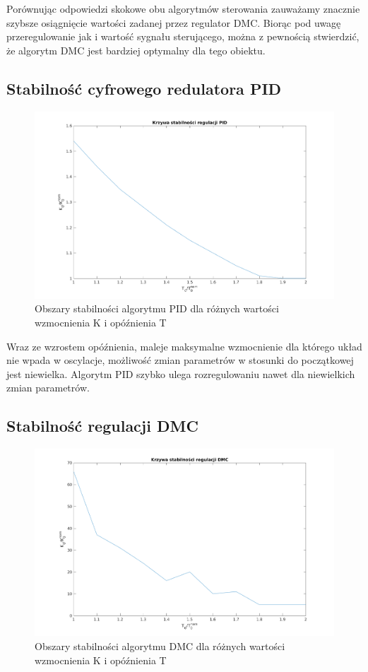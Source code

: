 \documentclass[a4paper, 11pt]{article}
\begin{document}
Porównując odpowiedzi skokowe obu algorytmów sterowania zauważamy znacznie szybsze osiągnięcie wartości zadanej przez regulator DMC. Biorąc pod uwagę przeregulowanie jak i wartość sygnału sterującego, można z pewnością stwierdzić, że algorytm DMC jest bardziej optymalny dla tego obiektu. 

 
\subsection{Stabilność cyfrowego redulatora PID}
\begin{figure}[H]
\centering
\includegraphics[scale=0.60]{pid_stability.png}
\caption{Obszary stabilności algorytmu PID dla różnych wartości wzmocnienia K i opóźnienia T}
\end{figure}
Wraz ze wzrostem opóźnienia, maleje maksymalne wzmocnienie dla którego układ nie wpada w oscylacje, możliwość zmian parametrów w stosunki do początkowej jest niewielka. Algorytm PID szybko ulega rozregulowaniu nawet dla niewielkich zmian parametrów. 
 
\subsection{Stabilność regulacji DMC}
\begin{figure}[H]
\centering
\includegraphics[scale=0.60]{DMC_stability.png}
\caption{Obszary stabilności algorytmu DMC dla różnych wartości wzmocnienia K i opóźnienia T}
\end{figure}
\end{document}
